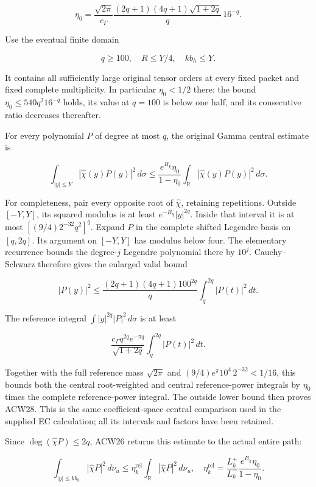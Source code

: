 \[
\eta_0=
\frac{\sqrt{2\pi}}{c_\Gamma}
\frac{(2q+1)(4q+1)\sqrt{1+2q}}q\,16^{-q}.
\tag{ACW27}
\]

Use the eventual finite domain

\[
q\ge100,\quad R\le Y/4,\quad kb_h\le Y.
\]

It contains all sufficiently large original tensor orders at every fixed packet and fixed complete multiplicity. In particular \(\eta_0<1/2\) there: the bound \(\eta_0\le540q^2 16^{-q}\) holds, its value at \(q=100\) is below one half, and its consecutive ratio decreases thereafter.

For every polynomial \(P\) of degree at most \(q\), the original Gamma central estimate is

\[
\int_{|y|\le Y}|\widehat\chi(y)P(y)|^2\,d\sigma
\le
\frac{e^{B_\chi}\eta_0}{1-\eta_0}
\int_{\mathbb R}|\widehat\chi(y)P(y)|^2\,d\sigma.
\tag{ACW28}
\]

For completeness, pair every opposite root of \(\widehat\chi\), retaining repetitions. Outside \([-Y,Y]\), its squared modulus is at least
\(e^{-B_\chi}|y|^{2q}\). Inside that interval it is at most
\([(9/4)2^{-32}q^2]^q\).
Expand \(P\) in the complete shifted Legendre basis on \([q,2q]\). Its argument on \([-Y,Y]\) has modulus below four. The elementary recurrence bounds the degree-\(j\) Legendre polynomial there by \(10^j\). Cauchy--Schwarz therefore gives the enlarged valid bound

\[
|P(y)|^2\le
\frac{(2q+1)(4q+1)100^{2q}}q
\int_q^{2q}|P(t)|^2\,dt.
\]

The reference integral
\(\int|y|^{2q}|P|^2\,d\sigma\) is at least

\[
\frac{c_\Gamma q^{2q}e^{-\pi q}}{\sqrt{1+2q}}
\int_q^{2q}|P(t)|^2\,dt.
\]

Together with the full reference mass \(\sqrt{2\pi}\) and
\((9/4)e^\pi10^4\,2^{-32}<1/16\), this bounds both the central root-weighted and central reference-power integrals by \(\eta_0\) times the complete reference-power integral. The outside lower bound then proves ACW28. This is the same coefficient-space central comparison used in the supplied EC calculation; all its intervals and factors have been retained.

Since \(\deg(\widehat\chi P)\le2q\), ACW26 returns this estimate to the actual entire path:

\[
\boxed{
\int_{|y|\le kb_h}|\widehat\chi P|^2\,d\nu_u
\le\eta_k^{\mathrm{rel}}\int_{\mathbb R}|\widehat\chi P|^2\,d\nu_u,
\quad
\eta_k^{\mathrm{rel}}=
\frac{L_k^+}{L_k^-}\frac{e^{B_\chi}\eta_0}{1-\eta_0}.}
\tag{ACW29}
\]

